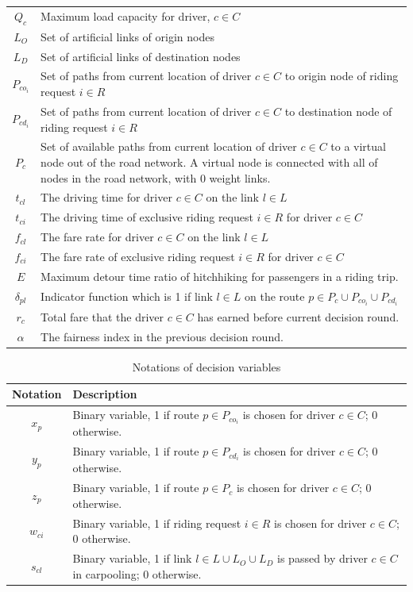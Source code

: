 \begin{longtable}{cp{14cm}}
    $Q_c$ & Maximum load capacity for driver, $c \in C$ \\
    $L_{O}$ & Set of artificial links of origin nodes \\
    $L_{D}$ & Set of artificial links of destination nodes \\
    $P_{co_i}$ & Set of paths from current location of driver $c \in C$ to origin node of riding request $i \in R$ \\
    $P_{cd_i}$ & Set of paths from current location of driver $c \in C$ to destination node of riding request $i \in R$ \\
    $P_c$ & Set of available paths from current location of driver $c \in C$ to a virtual node out of the road network. A virtual node is connected with all of nodes in the road network, with 0 weight links. \\
    $t_{cl}$ & The driving time for driver $c \in C$ on the link $l \in L$ \\
    $t_{ci}$ & The driving time of exclusive riding request $i \in R$ for driver $c \in C$ \\
    $f_{cl}$ & The fare rate for driver $c \in C$ on the link $l \in L$ \\
    $f_{ci}$ & The fare rate of exclusive riding request $i \in R$ for driver $c \in C$ \\
    $E$ & Maximum detour time ratio of hitchhiking for passengers in a riding trip. \\
    $\delta_{pl}$ & Indicator function which is 1 if link $l \in L$ on the route $p \in P_c \cup P_{co_i} \cup P_{cd_i}$ \\
    $r_c$ & Total fare that the driver $c \in C$ has earned before current decision round. \\
    $\alpha$ & The fairness index in the previous decision round. \\
  \bottomrule
\end{longtable}  
\par

\begin{longtable}{cp{14cm}}
  \caption{Notations of decision variables}\\
  \toprule
  \multicolumn{1}{l}{Notation}&
  \multicolumn{1}{l}{Description}\\
  \midrule
  \endhead
    $x_{p}$ & Binary variable, 1 if route $p \in P_{co_i}$ is chosen for driver $c \in C$; 0 otherwise. \\
    $y_{p}$ & Binary variable, 1 if route $p \in P_{cd_i}$ is chosen for driver $c \in C$; 0 otherwise. \\
    $z_{p}$ & Binary variable, 1 if route $p \in P_c$ is chosen for driver $c \in C$; 0 otherwise. \\
    $w_{ci}$ & Binary variable, 1 if riding request $i \in R$ is chosen for driver $c \in C$; 0 otherwise. \\
    $s_{cl}$ & Binary variable, 1 if link $l \in L \cup L_O \cup L_D$ is passed by driver $c \in C$ in carpooling; 0 otherwise. \\
  \bottomrule
\end{longtable}  
\newpage


